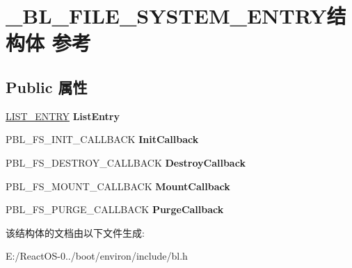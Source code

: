\hypertarget{struct___b_l___f_i_l_e___s_y_s_t_e_m___e_n_t_r_y}{}\section{\+\_\+\+B\+L\+\_\+\+F\+I\+L\+E\+\_\+\+S\+Y\+S\+T\+E\+M\+\_\+\+E\+N\+T\+R\+Y结构体 参考}
\label{struct___b_l___f_i_l_e___s_y_s_t_e_m___e_n_t_r_y}
\subsection*{Public 属性}
\begin{DoxyCompactItemize}
\item 
\mbox{\label{struct___b_l___f_i_l_e___s_y_s_t_e_m___e_n_t_r_y_acb3310faa045a660ff4132a9ea6950d1}} 
\hyperlink{struct___l_i_s_t___e_n_t_r_y}{L\+I\+S\+T\+\_\+\+E\+N\+T\+RY} {\bfseries List\+Entry}
\item 
\mbox{\label{struct___b_l___f_i_l_e___s_y_s_t_e_m___e_n_t_r_y_a8693e25d9270eedec968f1d8430eafe1}} 
P\+B\+L\+\_\+\+F\+S\+\_\+\+I\+N\+I\+T\+\_\+\+C\+A\+L\+L\+B\+A\+CK {\bfseries Init\+Callback}
\item 
\mbox{\label{struct___b_l___f_i_l_e___s_y_s_t_e_m___e_n_t_r_y_a79bfc97a8e0c41ef224460713b194394}} 
P\+B\+L\+\_\+\+F\+S\+\_\+\+D\+E\+S\+T\+R\+O\+Y\+\_\+\+C\+A\+L\+L\+B\+A\+CK {\bfseries Destroy\+Callback}
\item 
\mbox{\label{struct___b_l___f_i_l_e___s_y_s_t_e_m___e_n_t_r_y_ac972fb21539258ca21b406553bb36997}} 
P\+B\+L\+\_\+\+F\+S\+\_\+\+M\+O\+U\+N\+T\+\_\+\+C\+A\+L\+L\+B\+A\+CK {\bfseries Mount\+Callback}
\item 
\mbox{\label{struct___b_l___f_i_l_e___s_y_s_t_e_m___e_n_t_r_y_a42e485ff1c702fc159475f55a5c2bd16}} 
P\+B\+L\+\_\+\+F\+S\+\_\+\+P\+U\+R\+G\+E\+\_\+\+C\+A\+L\+L\+B\+A\+CK {\bfseries Purge\+Callback}
\end{DoxyCompactItemize}


该结构体的文档由以下文件生成\+:\begin{DoxyCompactItemize}
\item 
E\+:/\+React\+O\+S-\/0../boot/environ/include/bl.\+h\end{DoxyCompactItemize}
